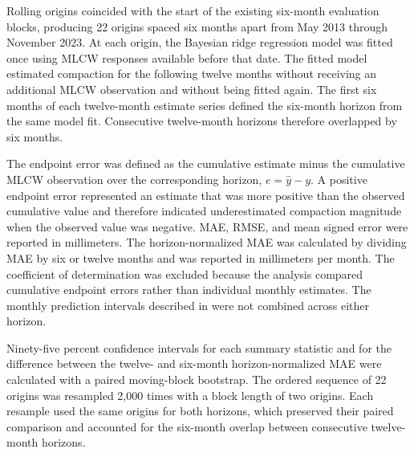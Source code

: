 Rolling origins coincided with the start of the existing six-month evaluation blocks, producing 22 origins spaced six months apart from May 2013 through November 2023. At each origin, the Bayesian ridge regression model was fitted once using MLCW responses available before that date. The fitted model estimated compaction for the following twelve months without receiving an additional MLCW observation and without being fitted again. The first six months of each twelve-month estimate series defined the six-month horizon from the same model fit. Consecutive twelve-month horizons therefore overlapped by six months.

The endpoint error was defined as the cumulative estimate minus the cumulative MLCW observation over the corresponding horizon, $e=\hat{y}-y$. A positive endpoint error represented an estimate that was more positive than the observed cumulative value and therefore indicated underestimated compaction magnitude when the observed value was negative. MAE, RMSE, and mean signed error were reported in millimeters. The horizon-normalized MAE was calculated by dividing MAE by six or twelve months and was reported in millimeters per month. The coefficient of determination was excluded because the analysis compared cumulative endpoint errors rather than individual monthly estimates. The monthly prediction intervals described in  were not combined across either horizon.

Ninety-five percent confidence intervals for each summary statistic and for the difference between the twelve- and six-month horizon-normalized MAE were calculated with a paired moving-block bootstrap. The ordered sequence of 22 origins was resampled 2,000 times with a block length of two origins. Each resample used the same origins for both horizons, which preserved their paired comparison and accounted for the six-month overlap between consecutive twelve-month horizons.

\FloatBarrier
